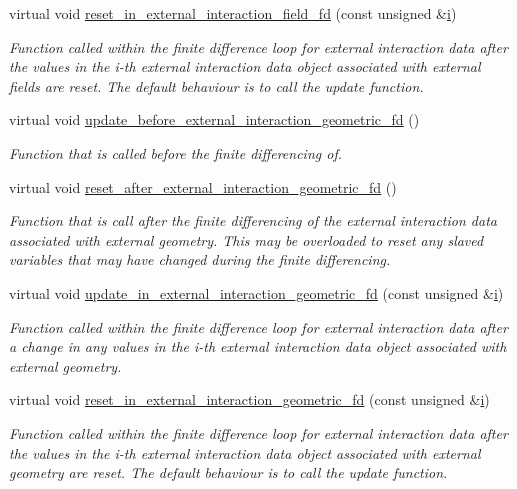 \begin{DoxyCompactItemize}
virtual void \hyperlink{classoomph_1_1ElementWithExternalElement_a4ee53afaf9a09c5e2e5cbc488ca7cd7f}{reset\+\_\+in\+\_\+external\+\_\+interaction\+\_\+field\+\_\+fd} (const unsigned \&\hyperlink{cfortran_8h_adb50e893b86b3e55e751a42eab3cba82}{i})
\begin{DoxyCompactList}\small\item\em Function called within the finite difference loop for external interaction data after the values in the i-\/th external interaction data object associated with external fields are reset. The default behaviour is to call the update function. \end{DoxyCompactList}\item 
virtual void \hyperlink{classoomph_1_1ElementWithExternalElement_a2460f9def76ae512936eba0a1010cdc2}{update\+\_\+before\+\_\+external\+\_\+interaction\+\_\+geometric\+\_\+fd} ()
\begin{DoxyCompactList}\small\item\em Function that is called before the finite differencing of. \end{DoxyCompactList}\item 
virtual void \hyperlink{classoomph_1_1ElementWithExternalElement_a902a29b3e23a6fb6a6b06e672162a578}{reset\+\_\+after\+\_\+external\+\_\+interaction\+\_\+geometric\+\_\+fd} ()
\begin{DoxyCompactList}\small\item\em Function that is call after the finite differencing of the external interaction data associated with external geometry. This may be overloaded to reset any slaved variables that may have changed during the finite differencing. \end{DoxyCompactList}\item 
virtual void \hyperlink{classoomph_1_1ElementWithExternalElement_ab34f7db5cb5a473c6f5552f34af4a651}{update\+\_\+in\+\_\+external\+\_\+interaction\+\_\+geometric\+\_\+fd} (const unsigned \&\hyperlink{cfortran_8h_adb50e893b86b3e55e751a42eab3cba82}{i})
\begin{DoxyCompactList}\small\item\em Function called within the finite difference loop for external interaction data after a change in any values in the i-\/th external interaction data object associated with external geometry. \end{DoxyCompactList}\item 
virtual void \hyperlink{classoomph_1_1ElementWithExternalElement_a2bc7a069b01795d9c8036fb81e8b319d}{reset\+\_\+in\+\_\+external\+\_\+interaction\+\_\+geometric\+\_\+fd} (const unsigned \&\hyperlink{cfortran_8h_adb50e893b86b3e55e751a42eab3cba82}{i})
\begin{DoxyCompactList}\small\item\em Function called within the finite difference loop for external interaction data after the values in the i-\/th external interaction data object associated with external geometry are reset. The default behaviour is to call the update function. \end{DoxyCompactList}\end{DoxyCompactItemize}
